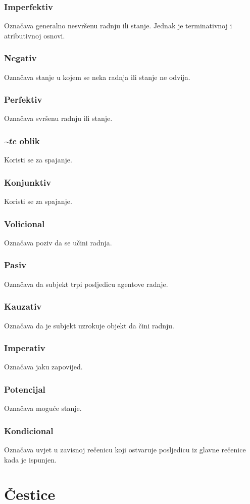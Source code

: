 \documentclass[a4paper, 12pt]{amsart}
\begin{document}
  \subsubsection{Imperfektiv}
  Označava generalno nesvršenu radnju ili stanje.
  Jednak je terminativnoj i atributivnoj osnovi.

  \subsubsection{Negativ}
  Označava stanje u kojem se neka radnja ili stanje ne odvija.

  \subsubsection{Perfektiv}
  Označava svršenu radnju ili stanje.

  \subsubsection{\textit{\textasciitilde{}te} oblik}
  Koristi se za spajanje.

  \subsubsection{Konjunktiv}
  Koristi se za spajanje.

  \subsubsection{Volicional}
  Označava poziv da se učini radnja.

  \subsubsection{Pasiv}
  Označava da subjekt trpi posljedicu agentove radnje.

  \subsubsection{Kauzativ}
  Označava da je subjekt uzrokuje objekt da čini radnju.

  \subsubsection{Imperativ}
  Označava jaku zapovijed.

  \subsubsection{Potencijal}
  Označava moguće stanje.

  \subsubsection{Kondicional}
  Označava uvjet u zavisnoj rečenicu koji ostvaruje posljedicu iz glavne rečenice kada je ispunjen.

  \section{Čestice}
\end{document}
